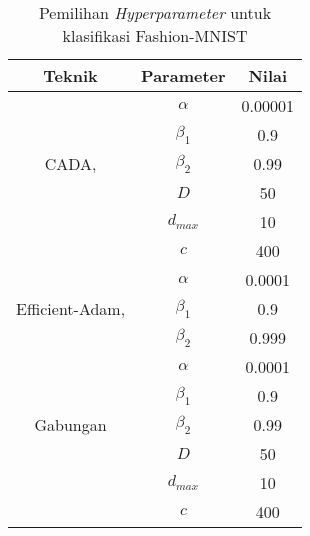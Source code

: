 \begin{table}[H]
  \caption{Pemilihan \emph{Hyperparameter} untuk klasifikasi Fashion-MNIST}\label{hyperparamfashion}
  \centering
  \begin{tabular}{ | c | c | c | }
    \hline
    \textbf{Teknik}                                               & \textbf{Parameter} & \textbf{Nilai} \\
    \hline
    \multirow{5}{*}{CADA, \textcite{Chen2021CADA}}                & $\alpha$           & 0.00001        \\
                                                                  & $\beta_1$          & 0.9            \\
                                                                  & $\beta_2$          & 0.99           \\
                                                                  & $D$                & 50             \\
                                                                  & $d_{max}$          & 10             \\
                                                                  & $c$                & 400            \\
    \hline
    \multirow{3}{*}{Efficient-Adam, \textcite{Chen2022Efficient}} & $\alpha$           & 0.0001         \\
                                                                  & $\beta_1$          & 0.9            \\
                                                                  & $\beta_2$          & 0.999          \\
    \hline
    \multirow{5}{*}{Gabungan}                                     & $\alpha$           & 0.0001         \\
                                                                  & $\beta_1$          & 0.9            \\
                                                                  & $\beta_2$          & 0.99           \\
                                                                  & $D$                & 50             \\
                                                                  & $d_{max}$          & 10             \\
                                                                  & $c$                & 400            \\
    \hline
  \end{tabular}
\end{table}


